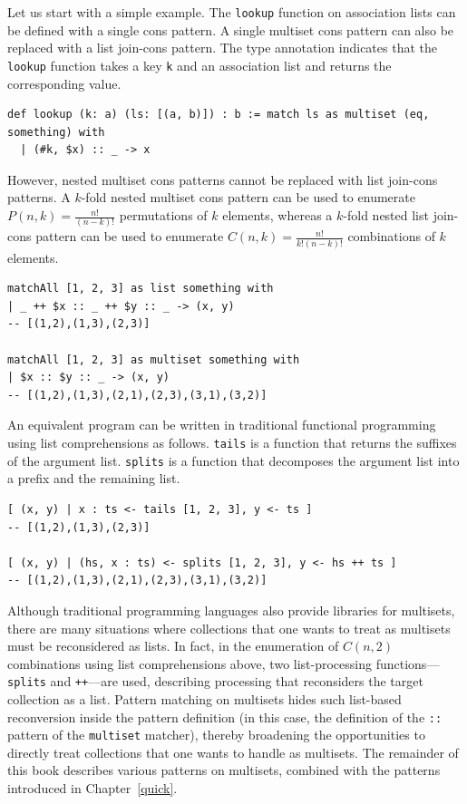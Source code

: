 Let us start with a simple example.
The \lstinline{lookup} function on association lists can be defined with a single cons pattern.
A single multiset cons pattern can also be replaced with a list join-cons pattern.
The type annotation indicates that the \lstinline{lookup} function takes a key \lstinline{k} and an association list and returns the corresponding value.
\begin{lstlisting}[language=egison,numbers=none]
def lookup (k: a) (ls: [(a, b)]) : b := match ls as multiset (eq, something) with
  | (#k, $x) :: _ -> x
\end{lstlisting}
However, nested multiset cons patterns cannot be replaced with list join-cons patterns.
A $k$-fold nested multiset cons pattern can be used to enumerate $P(n,k) = \frac{n!}{(n-k)!}$ permutations of $k$ elements, whereas a $k$-fold nested list join-cons pattern can be used to enumerate $C(n,k) = \frac{n!}{k!(n-k)!}$ combinations of $k$ elements.
\begin{lstlisting}[language=egison,numbers=none]
matchAll [1, 2, 3] as list something with
| _ ++ $x :: _ ++ $y :: _ -> (x, y)
-- [(1,2),(1,3),(2,3)]

matchAll [1, 2, 3] as multiset something with
| $x :: $y :: _ -> (x, y)
-- [(1,2),(1,3),(2,1),(2,3),(3,1),(3,2)]
\end{lstlisting}
An equivalent program can be written in traditional functional programming using list comprehensions as follows.
\lstinline{tails} is a function that returns the suffixes of the argument list.
\lstinline{splits} is a function that decomposes the argument list into a prefix and the remaining list.
\begin{lstlisting}[language=egison,numbers=none]
[ (x, y) | x : ts <- tails [1, 2, 3], y <- ts ]
-- [(1,2),(1,3),(2,3)]

[ (x, y) | (hs, x : ts) <- splits [1, 2, 3], y <- hs ++ ts ]
-- [(1,2),(1,3),(2,1),(2,3),(3,1),(3,2)]
\end{lstlisting}

Although traditional programming languages also provide libraries for multisets, there are many situations where collections that one wants to treat as multisets must be reconsidered as lists.
In fact, in the enumeration of $C(n,2)$ combinations using list comprehensions above, two list-processing functions---\lstinline{splits} and \lstinline{++}---are used, describing processing that reconsiders the target collection as a list.
Pattern matching on multisets hides such list-based reconversion inside the pattern definition (in this case, the definition of the \lstinline{::} pattern of the \lstinline{multiset} matcher), thereby broadening the opportunities to directly treat collections that one wants to handle as multisets.
The remainder of this book describes various patterns on multisets, combined with the patterns introduced in Chapter~\ref{quick}.


